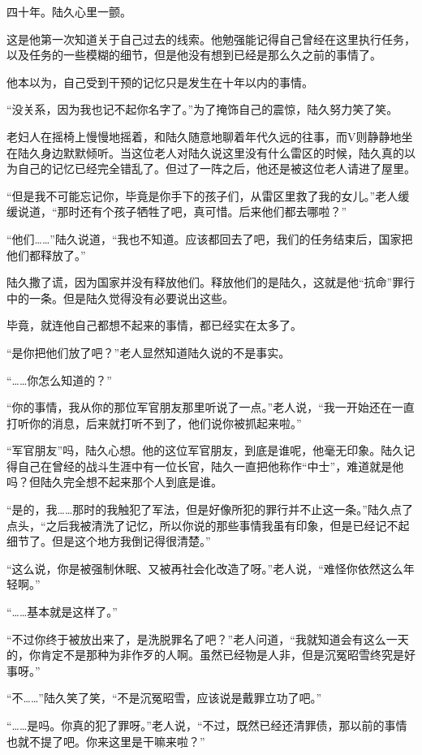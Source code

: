 四十年。陆久心里一颤。

这是他第一次知道关于自己过去的线索。他勉强能记得自己曾经在这里执行任务，以及任务的一些模糊的细节，但是他没有想到已经是那么久之前的事情了。

他本以为，自己受到干预的记忆只是发生在十年以内的事情。

“没关系，因为我也记不起你名字了。”为了掩饰自己的震惊，陆久努力笑了笑。

老妇人在摇椅上慢慢地摇着，和陆久随意地聊着年代久远的往事，而V则静静地坐在陆久身边默默倾听。当这位老人对陆久说这里没有什么雷区的时候，陆久真的以为自己的记忆已经完全错乱了。但过了一阵之后，他还是被这位老人请进了屋里。

“但是我不可能忘记你，毕竟是你手下的孩子们，从雷区里救了我的女儿。”老人缓缓说道，“那时还有个孩子牺牲了吧，真可惜。后来他们都去哪啦？”

“他们……”陆久说道，“我也不知道。应该都回去了吧，我们的任务结束后，国家把他们都释放了。”

陆久撒了谎，因为国家并没有释放他们。释放他们的是陆久，这就是他“抗命”罪行中的一条。但是陆久觉得没有必要说出这些。

毕竟，就连他自己都想不起来的事情，都已经实在太多了。

“是你把他们放了吧？”老人显然知道陆久说的不是事实。

“……你怎么知道的？”

“你的事情，我从你的那位军官朋友那里听说了一点。”老人说，“我一开始还在一直打听你的消息，后来就打听不到了，他们说你被抓起来啦。”

“军官朋友”吗，陆久心想。他的这位军官朋友，到底是谁呢，他毫无印象。陆久记得自己在曾经的战斗生涯中有一位长官，陆久一直把他称作“中士”，难道就是他吗？但陆久完全想不起来那个人到底是谁。

“是的，我……那时的我触犯了军法，但是好像所犯的罪行并不止这一条。”陆久点了点头，“之后我被清洗了记忆，所以你说的那些事情我虽有印象，但是已经记不起细节了。但是这个地方我倒记得很清楚。”

“这么说，你是被强制休眠、又被再社会化改造了呀。”老人说，“难怪你依然这么年轻啊。”

“……基本就是这样了。”

“不过你终于被放出来了，是洗脱罪名了吧？”老人问道，“我就知道会有这么一天的，你肯定不是那种为非作歹的人啊。虽然已经物是人非，但是沉冤昭雪终究是好事呀。”

“不……”陆久笑了笑，“不是沉冤昭雪，应该说是戴罪立功了吧。”

“……是吗。你真的犯了罪呀。”老人说，“不过，既然已经还清罪债，那以前的事情也就不提了吧。你来这里是干嘛来啦？”

